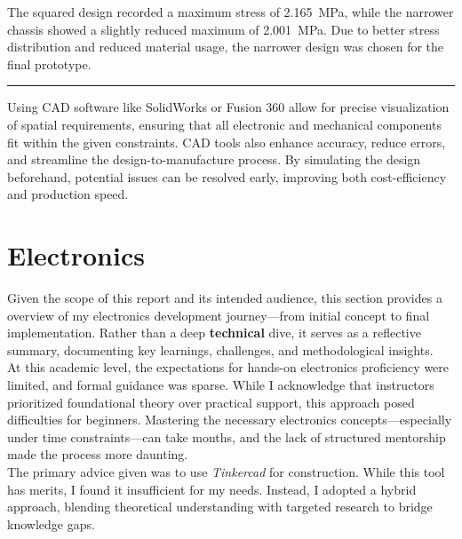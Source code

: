 \documentclass{article}
\begin{document}
The squared design recorded a maximum stress of 2.165~MPa, while the narrower chassis showed a slightly reduced maximum of 2.001~MPa. Due to better stress distribution and reduced material usage, the narrower design was chosen for the final prototype.
\vspace{0.7em}\hrule\vspace{1em}\noindent
Using CAD software like SolidWorks or Fusion 360 allow for precise visualization of spatial requirements, ensuring that all electronic and mechanical components fit within the given constraints. CAD tools also enhance accuracy, reduce errors, and streamline the design-to-manufacture process. By simulating the design beforehand, potential issues can be resolved early, improving both cost-efficiency and production speed.

\newpage{}
\section{Electronics}
Given the scope of this report and its intended audience, this section provides a overview of my electronics development journey---from initial concept to final implementation. Rather than a deep \textbf{technical} dive, it serves as a reflective summary, documenting key learnings, challenges, and methodological insights.\\[8pt]
At this academic level, the expectations for hands-on electronics proficiency were limited, and formal guidance was sparse. While I acknowledge that instructors prioritized foundational theory over practical support, this approach posed difficulties for beginners. Mastering the necessary electronics concepts---especially under time constraints---can take months, and the lack of structured mentorship made the process more daunting.\\[8pt]
The primary advice given was to use \textit{Tinkercad} for construction. While this tool has merits, I found it insufficient for my needs. Instead, I adopted a hybrid approach, blending theoretical understanding with targeted research to bridge knowledge gaps.
\vspace{-0.4em}
\end{document}
